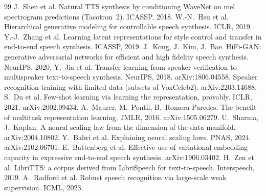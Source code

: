 \documentclass[a4paper,11pt]{article}
\begin{document}
\begin{thebibliography}{99}\small
{} J.~Shen et al. Natural TTS synthesis by conditioning WaveNet on mel spectrogram predictions (Tacotron~2). ICASSP, 2018.
 W.-N.~Hsu et al. Hierarchical generative modeling for controllable speech synthesis. ICLR, 2019.
 Y.-J.~Zhang et al. Learning latent representations for style control and transfer in end-to-end speech synthesis. ICASSP, 2019.
 J.~Kong, J.~Kim, J.~Bae. HiFi-GAN: generative adversarial networks for efficient and high fidelity speech synthesis. NeurIPS, 2020.
 Y.~Jia et al. Transfer learning from speaker verification to multispeaker text-to-speech synthesis. NeurIPS, 2018. arXiv:1806.04558.
 Speaker recognition training with limited data (subsets of VoxCeleb2). arXiv:2203.14688.
 S.~Du et al. Few-shot learning via learning the representation, provably. ICLR, 2021. arXiv:2002.09434.
 A.~Maurer, M.~Pontil, B.~Romera-Paredes. The benefit of multitask representation learning. JMLR, 2016. arXiv:1505.06279.
 U.~Sharma, J.~Kaplan. A neural scaling law from the dimension of the data manifold. arXiv:2004.10802.
 Y.~Bahri et al. Explaining neural scaling laws. PNAS, 2024. arXiv:2102.06701.
 E.~Battenberg et al. Effective use of variational embedding capacity in expressive end-to-end speech synthesis. arXiv:1906.03402.
 H.~Zen et al. LibriTTS: a corpus derived from LibriSpeech for text-to-speech. Interspeech, 2019.
 A.~Radford et al. Robust speech recognition via large-scale weak supervision. ICML, 2023.
\end{thebibliography}
\end{document}
